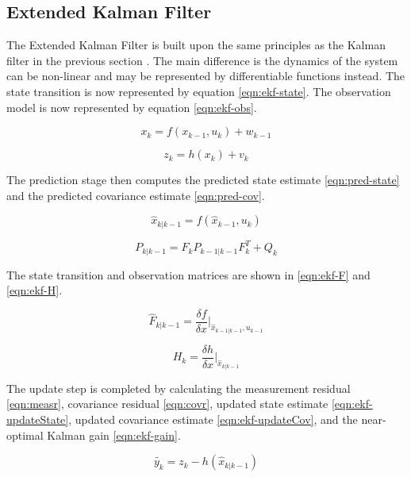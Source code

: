\documentclass[12pt,twocolumn,letterpaper]{article}
\begin{document}
\subsection{Extended Kalman Filter}
The Extended Kalman Filter is built upon the same principles as the Kalman filter in the previous section \cite{Maria}.  The main difference is the dynamics of the system can be non-linear and may be represented by differentiable functions instead.  The state transition is now represented by equation \ref{eqn:ekf-state}.  The observation model is now represented by equation \ref{eqn:ekf-obs}.

\begin{equation}
x_k = f(x_{k-1}, u_k) + w_{k-1}
\label{eqn:ekf-state}
\end{equation}

\begin{equation}
z_k = h(x_k) + v_k
\label{eqn:ekf-obs}
\end{equation}

The prediction stage then computes the predicted state estimate \ref{eqn:pred-state} and the predicted covariance estimate \ref{eqn:pred-cov}.

\begin{equation}
\hat{x}_{k|k-1} = f(\hat{x}_{k-1}, u_k)
\label{eqn:pred-state}
\end{equation}

\begin{equation}
P_{k|k-1} = F_kP_{k-1|k-1}F_k^T + Q_k
\label{eqn:pred-cov}
\end{equation}

The state transition and observation matrices are shown in \ref{eqn:ekf-F} and \ref{eqn:ekf-H}.

\begin{equation}
\hat{F}_{k|k-1} = \frac{\delta f}{\delta x}\Bigr|_{\hat{x}_{k-1|k-1}, u_{k-1}}
\label{eqn:ekf-F}
\end{equation}

\begin{equation}
H_{k} = \frac{\delta h}{\delta x}\Bigr|_{\hat{x}_{k|k-1}}
\label{eqn:ekf-H}
\end{equation}

The update step is completed by calculating the measurement residual \ref{eqn:measr}, covariance residual \ref{eqn:covr}, updated state estimate \ref{eqn:ekf-updateState}, updated covariance estimate \ref{eqn:ekf-updateCov}, and the near-optimal Kalman gain \ref{eqn:ekf-gain}.

\begin{equation}
\tilde{y_k} = z_k -h(\hat{x}_{k|k-1})
\label{eqn:measr}
\end{equation}
\end{document}
